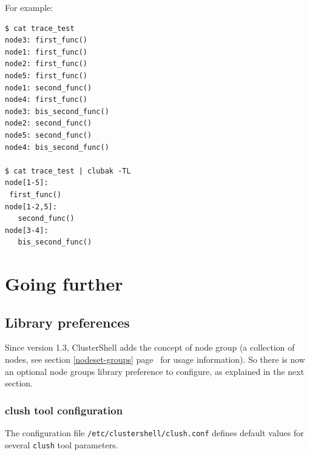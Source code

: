 \documentclass[english,a4paper]{csuserguide}
\newcommand{\clush}{\texttt{clush}\xspace}
\begin{document}
For example:
\medskip
\begin{lstlisting}[breaklines=true, breakatwhitespace=true]
$ cat trace_test
node3: first_func()
node1: first_func()
node2: first_func()
node5: first_func()
node1: second_func()
node4: first_func()
node3: bis_second_func()
node2: second_func()
node5: second_func()
node4: bis_second_func()

$ cat trace_test | clubak -TL
node[1-5]:
 first_func()
node[1-2,5]:
   second_func()
node[3-4]:
   bis_second_func()
\end{lstlisting}



\newpage



\section{Going further}

\subsection{Library preferences}

Since version 1.3, ClusterShell adds the concept of node group (a collection of nodes, see section \ref{nodeset-groups} page~\pageref{nodeset-groups} for usage information). So there is now an optional node groups library preference to configure, as explained in the next section.


\subsubsection{clush tool configuration}

The configuration file \verb+/etc/clustershell/clush.conf+ defines default values for several \clush tool parameters.
\end{document}
